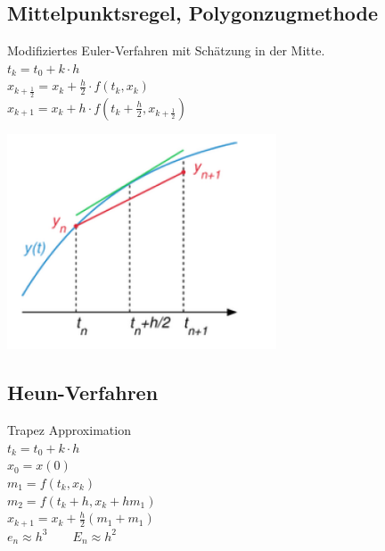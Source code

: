\begin{minipage}{0.6\linewidth}
    \subsection{Mittelpunktsregel, Polygonzugmethode}
     Modifiziertes Euler-Verfahren mit Schätzung in der Mitte. \\
     $t_k = t_0 + k \cdot h$ \\
     $x_{k+\frac{1}{2}} = x_k + \frac{h}{2} \cdot f(t_k, x_k)$ \\
     $x_{k+1} = x_k + h \cdot f(t_k + \frac{h}{2}, x_{k+\frac{1}{2}})$ \\
\end{minipage}
\begin{minipage}{0.4\linewidth}
	\includegraphics[width= 0.6\textwidth]{images/mittelpunkt.png}
\end{minipage}
\begin{minipage}{0.6\linewidth}
    \subsection{Heun-Verfahren}
    Trapez Approximation \\
    $t_k = t_0 + k  \cdot h$ \\
    $x_0 = x(0)$ \\
    $m_1 = f(t_k, x_k)$ \\
    $m_2 = f(t_k + h, x_k + hm_1)$\\
    $x_{k+1} = x_k + \frac{h}{2}(m_1 + m_1)$\\
    $e_n  \approx h^3 \qquad E_n \approx h^2$\\
\end{minipage}
\begin{minipage}{0.4\linewidth}
    
\end{minipage}
